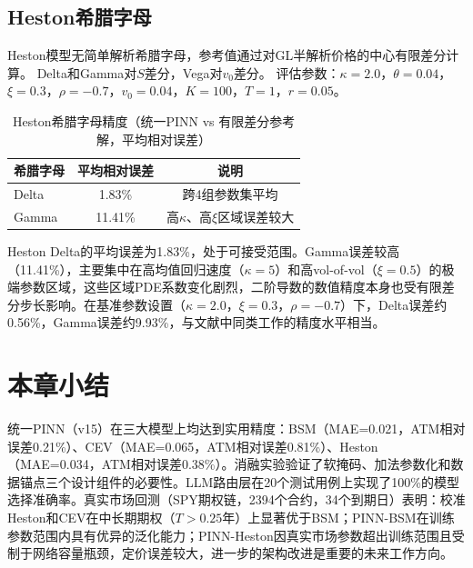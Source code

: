 \subsection{Heston希腊字母}

Heston模型无简单解析希腊字母，参考值通过对GL半解析价格的中心有限差分计算。
Delta和Gamma对$S$差分，Vega对$v_0$差分。
评估参数：$\kappa=2.0$，$\theta=0.04$，$\xi=0.3$，$\rho=-0.7$，$v_0=0.04$，$K=100$，$T=1$，$r=0.05$。

\begin{table}[htbp]
  \centering
  \caption{Heston希腊字母精度（统一PINN vs 有限差分参考解，平均相对误差）}
  \label{tab:greeks_heston}
  \begin{tabular}{lcc}
    \hline
    希腊字母 & 平均相对误差 & 说明 \\
    \hline
    Delta & 1.83\%  & 跨4组参数集平均 \\
    Gamma & 11.41\% & 高$\kappa$、高$\xi$区域误差较大 \\
    \hline
  \end{tabular}
\end{table}

Heston Delta的平均误差为1.83\%，处于可接受范围。Gamma误差较高（11.41\%），主要集中在高均值回归速度（$\kappa=5$）和高vol-of-vol（$\xi=0.5$）的极端参数区域，这些区域PDE系数变化剧烈，二阶导数的数值精度本身也受有限差分步长影响。在基准参数设置（$\kappa=2.0$，$\xi=0.3$，$\rho=-0.7$）下，Delta误差约0.56\%，Gamma误差约9.93\%，与文献中同类工作的精度水平相当。

\section{本章小结}\label{sec:exp_summary}

统一PINN（v15）在三大模型上均达到实用精度：BSM（MAE=0.021，ATM相对误差0.21\%）、CEV（MAE=0.065，ATM相对误差0.81\%）、Heston（MAE=0.034，ATM相对误差0.38\%）。消融实验验证了软掩码、加法参数化和数据锚点三个设计组件的必要性。LLM路由层在20个测试用例上实现了100\%的模型选择准确率。真实市场回测（SPY期权链，2394个合约，34个到期日）表明：校准Heston和CEV在中长期期权（$T>0.25$年）上显著优于BSM；PINN-BSM在训练参数范围内具有优异的泛化能力；PINN-Heston因真实市场参数超出训练范围且受制于网络容量瓶颈，定价误差较大，进一步的架构改进是重要的未来工作方向。
